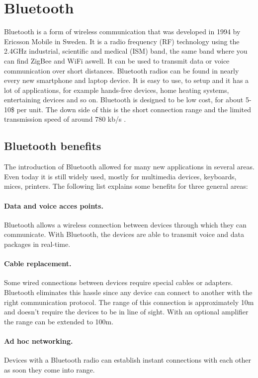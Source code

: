 \documentclass[a4paper, 11pt]{report}
\begin{document}
\section{Bluetooth}
Bluetooth is a form of wireless communication that was developed in 1994 by Ericsson Mobile in Sweden. It is a radio frequency (RF) technology using the 2.4GHz industrial, scientific and medical (ISM) band, the same band where you can find ZigBee and WiFi aswell. It can be used to transmit data or voice communication over short distances. Bluetooth radios can be found in nearly every new smartphone and laptop device. It is easy to use, to setup and it has a lot of applications, for example hands-free devices, home heating systems, entertaining devices and so on. Bluetooth is designed to be low cost, for about 5-10\$ per unit. The down side of this is the short connection range and the limited transmission speed of around 780 kb/s \cite{bluetoothTech}.\\

	\subsection{Bluetooth benefits}
The introduction of Bluetooth allowed for many new applications in several areas. Even today it is still widely used, mostly for multimedia devices, keyboards, mices, printers. The following list explains some benefits for three general areas:
		\paragraph{Data and voice acces points.}
Bluetooth allows a wireless connection between devices through which they can communicate. With Bluetooth, the devices are able to transmit voice and data packages in real-time.
		\paragraph{Cable replacement.}
Some wired connections between devices require special cables or adapters. Bluetooth eliminates this hassle since any device can connect to another with the right communication protocol. The range of this connection is approximately 10m and doesn't require the devices to be in line of sight. With an optional amplifier the range can be extended to 100m.
		\paragraph{Ad hoc networking.}
Devices with a Bluetooth radio can establish instant connections with each other as soon they come into range.
\end{document}
